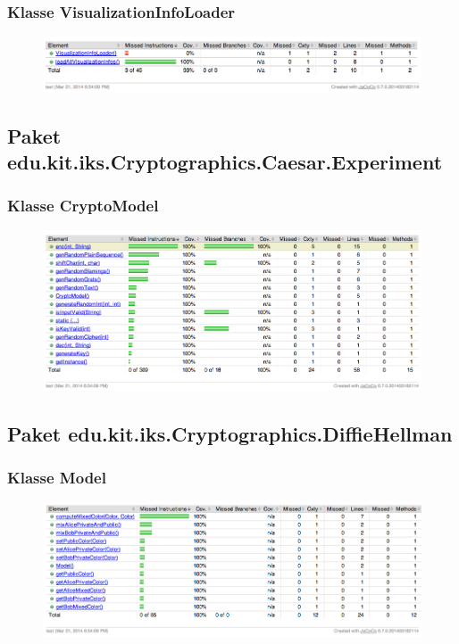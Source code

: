 \documentclass{article}
\begin{document}
    \subsubsection{Klasse VisualizationInfoLoader}
      \begin{figure}[H]
        \centering
          \includegraphics[width=\textwidth]{resources/coverage_lib_visualizationinfoloader}
      \end{figure}

  \subsection{Paket edu.kit.iks.Cryptographics.Caesar.Experiment}
    \subsubsection{Klasse CryptoModel}
      \begin{figure}[H]
        \centering
          \includegraphics[width=\textwidth]{resources/coverage_caesar_model}
      \end{figure}

  \subsection{Paket edu.kit.iks.Cryptographics.DiffieHellman}
    \subsubsection{Klasse Model}
      \begin{figure}[H]
        \centering
          \includegraphics[width=\textwidth]{resources/coverage_diffiehellman_model}
      \end{figure}
\end{document}
